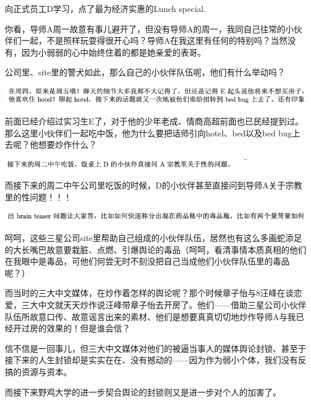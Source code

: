 \documentclass[9pt, b5paper]{article}
\begin{document}
向正式员工D学习，点了最为经济实惠的Lunch special. 

你看，导师A周一故意有事儿避开了，但没有导师A的周一，我同自己往常的小伙伴们一起，不是照样玩耍得很开心吗？导师A在我这里有任何的特别吗？当然没有，因为小弱弱的心中始终住着的都是她亲爱的表哥。 

公司里、site里的警犬如此，那么自己的小伙伴队伍呢，他们有什么举动吗？

\begin{center}
\includegraphics[width=.9\linewidth]{./pic/backups_plans_20210513_111315.png}
\end{center}

前面已经介绍过实习生E了，对于他的少年老成、情商高超前面也已民经提到过。那么这里小伙伴们一起吃中饭，他为什么要把话师引向hotel、bed以及bed bug上去呢？他想要炒作什么？

\begin{center}
\includegraphics[width=.9\linewidth]{./pic/backups_plans_20210514_104217.png}
\end{center}

而接下来的周二中午公司里吃饭的时候，D的小伙伴甚至直接问到导师A关于宗教里的性问题！！！

\begin{center}
\includegraphics[width=.9\linewidth]{./pic/backups_plans_20210514_104605.png}
\end{center}

呵呵，这些三星公司site里帮助自己组成的小伙伴队伍，居然也有这么多画蛇添足的大长嘴巴故意要栽脏、点燃、引爆舆论的毒品（呵呵，看清事情本质真相的他们在我眼中是毒品，可他们何尝无时不刻没把自己当成他们小伙伴队伍里的毒品呢？）

而当时的三大中文媒体，在炒作着怎样的舆论呢？那个时候章子怡与8汪峰在谈恋爱，三大中文就天天炒作说汪峰带章子怡去开房了。他们——借助三星公司小伙伴队伍所故意口传、故意谣言出来的素材、他们是想要真真切切地炒作导师A与我已经开过房的效果的！但是谁会信？

信不信是一回事儿，但三大中文媒体对他们的被逼当事人的媒体舆论封锁、甚至于接下来的人生封锁却是实实在在、没有撼动的——因为作为弱小个体，我们没有反搞的资源与资本。

而接下来野鸡大学的进一步契合舆论的封锁则又是进一步对个人的加害了。 
\end{document}
